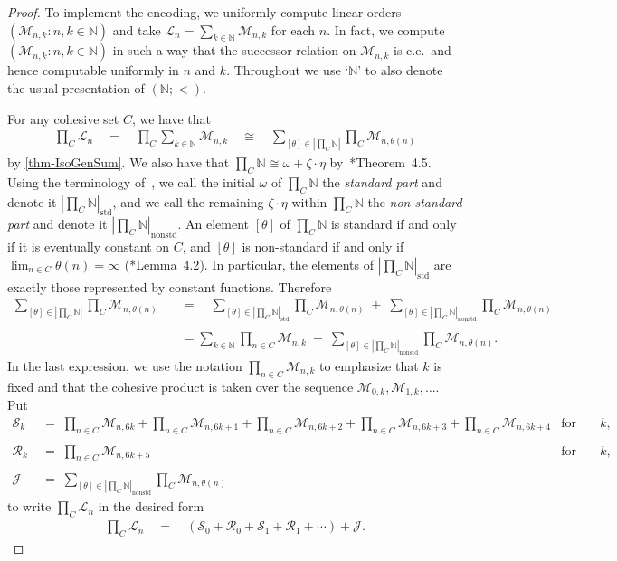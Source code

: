 \documentclass[11pt,a4paper,reqno]{amsart}
\theoremstyle{definition}
\newcommand{\iso}{\cong}
\newcommand{\Nb}{\mathbb{N}}
\newcommand{\mc}[1]{\mathcal{#1}}
\newcommand{\std}{\mathrm{std}}
\newcommand{\nonstd}{\mathrm{nonstd}}
\begin{document}
\begin{proof}
To implement the encoding, we uniformly compute linear orders $(\mc{M}_{n,k} : n, k \in \Nb)$ and take $\mc{L}_n = \sum_{k \in \Nb}\mc{M}_{n,k}$ for each $n$.  In fact, we compute $(\mc{M}_{n,k} : n, k \in \Nb)$ in such a way that the successor relation on $\mc{M}_{n,k}$ is c.e.\ and hence computable uniformly in $n$ and $k$.  Throughout we use `$\Nb$' to also denote the usual presentation of $(\Nb; <)$.  

For any cohesive set $C$, we have that
\begin{align*}
\prod\nolimits_C \mc{L}_n \quad=\quad \prod\nolimits_{C} \sum_{k \in \Nb}\mc{M}_{n,k} \quad\iso\quad \sum_{[\theta] \in \left|\prod_C \Nb \right|}\prod\nolimits_C \mc{M}_{n,\theta(n)}
\end{align*}
by \cref{thm-IsoGenSum}.  We also have that $\prod_C \Nb \iso \omega + \zeta\cdot\eta$ by~\cite{CohPowJournal}*{Theorem~4.5}.
Using the terminology of~\cite{CohPowJournal}, we call the initial $\omega$ of $\prod_C \Nb$ the \emph{standard part} and denote it $\left|\prod_C \Nb\right|_\std$, and we call the remaining $\zeta\cdot\eta$ within $\prod_C \Nb$ the \emph{non-standard part} and denote it $\left|\prod_C \Nb\right|_\nonstd$.  An element $[\theta]$ of $\prod_C \Nb$ is standard if and only if it is eventually constant on $C$, and $[\theta]$ is non-standard if and only if $\lim_{n \in C} \theta(n) = \infty$ (\cite{CohPowJournal}*{Lemma~4.2}).  In particular, the elements of $\left|\prod_C \Nb\right|_\std$ are exactly those represented by constant functions.  Therefore
\begin{align*}
\sum_{[\theta] \in \left|\prod_C \Nb \right|}\prod\nolimits_C \mc{M}_{n,\theta(n)} \quad&=\quad \sum_{[\theta] \in \left|\prod_C \Nb \right|_\std}\prod\nolimits_C \mc{M}_{n,\theta(n)} \;+\; \sum_{[\theta] \in \left|\prod_C \Nb \right|_\nonstd}\prod\nolimits_C \mc{M}_{n,\theta(n)}\\ \\
&= \sum_{k \in \Nb}\prod_{n \in C} \mc{M}_{n,k} \;+\; \sum_{[\theta] \in \left|\prod_C \Nb \right|_\nonstd}\prod\nolimits_C \mc{M}_{n,\theta(n)}.
\end{align*}
In the last expression, we use the notation $\prod_{n \in C} \mc{M}_{n,k}$ to emphasize that $k$ is fixed and that the cohesive product is taken over the sequence $\mc{M}_{0,k}, \mc{M}_{1,k}, \dots$.  Put
\begin{align*}
\mc{S}_k \;&=\; \prod_{n \in C} \mc{M}_{n, 6k} + \prod_{n \in C} \mc{M}_{n, 6k+1} + \prod_{n \in C} \mc{M}_{n, 6k+2} + \prod_{n \in C} \mc{M}_{n, 6k+3} + \prod_{n \in C} \mc{M}_{n, 6k+4} & \text{for each $k$,}\\ \\
\mc{R}_k \;&=\; \prod_{n \in C} \mc{M}_{n, 6k+5} & \text{for each $k$,}\\ \\
\mc{J} \;&=\; \sum_{[\theta] \in \left|\prod_C \Nb \right|_\nonstd}\prod\nolimits_C \mc{M}_{n,\theta(n)}
\end{align*}
to write $\prod_C \mc{L}_n$ in the desired form
\begin{align*}
\prod\nolimits_C \mc{L}_n \quad=\quad (\mc{S}_0 + \mc{R}_0 + \mc{S}_1 + \mc{R}_1 + \cdots) + \mc{J}.
\end{align*}


\end{proof}
\end{document}
